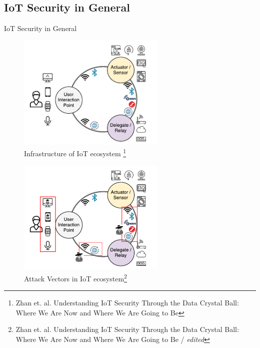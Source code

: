 \documentclass[11pt,t,usepdftitle=false,aspectratio=169]{beamer}
\begin{document}
\subsection{IoT Security in General} %
\label{sub:general_security}
\begin{frame}{IoT Security in General} %
	\only<1>
	{
		\begin{figure}
			\centering
			\includegraphics[height=5.5cm,keepaspectratio]{img/iot_ecosystem.png}
			\caption{\small{Infrastructure of IoT ecosystem} \footnote[frame]{\tiny{Zhan et. al. Understanding IoT Security Through the Data Crystal Ball: Where We Are Now and Where We Are Going to Be}}}
		\end{figure}

	}
	{
		\begin{figure}
			\centering
			\includegraphics[height=5.5cm, keepaspectratio]{img/iot-ecosystem_attack-vectors.png}
			\caption{\small{Attack Vectors in IoT ecosystem}\setcounter{footnote}{1}\footnote[frame]{\tiny{Zhan et. al. Understanding IoT Security Through the Data Crystal Ball: Where We Are Now and Where We Are Going to Be / \textit{edited}}}}
		\end{figure}
	}
\end{frame}
\end{document}
